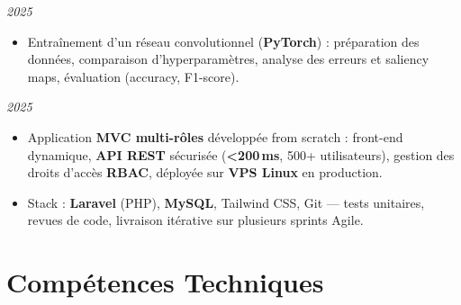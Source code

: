 \documentclass[9.5pt,a4paper]{article}
\begin{document}
\vspace{0.07cm}

%
\hfill{\footnotesize\color{accent}\textit{2025}}
\begin{itemize}
  \item {\footnotesize Entraînement d'un réseau convolutionnel (\textbf{PyTorch}) :
        préparation des données, comparaison d'hyperparamètres,
        analyse des erreurs et saliency maps, évaluation (accuracy, F1-score).}
\end{itemize}

\vspace{0.07cm}

%
\hfill{\footnotesize\color{accent}\textit{2025}}
\begin{itemize}
  \item {\footnotesize Application \textbf{MVC multi-rôles} développée from scratch :
        front-end dynamique, \textbf{API REST} sécurisée (\textbf{<200\,ms}, 500+ utilisateurs),
        gestion des droits d'accès \textbf{RBAC}, déployée sur \textbf{VPS Linux} en production.}
  \item {\footnotesize Stack : \textbf{Laravel} (PHP), \textbf{MySQL}, Tailwind CSS, Git ---
        tests unitaires, revues de code, livraison itérative sur plusieurs sprints Agile.}
\end{itemize}

\section{Compétences Techniques}
\end{document}
